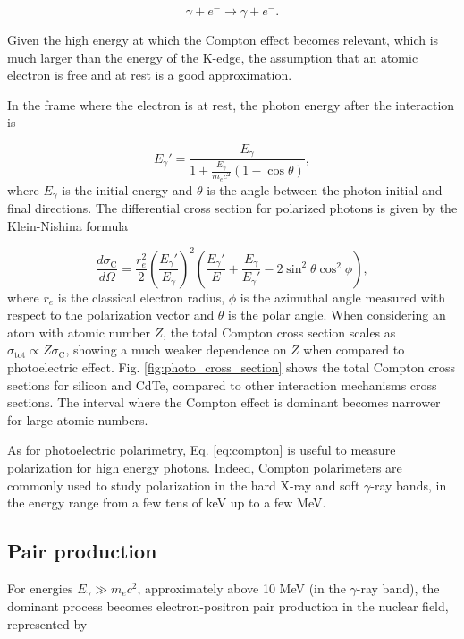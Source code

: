 \begin{equation}
\gamma + e^- \rightarrow \gamma + e^- .
\end{equation}

Given the high energy at which the Compton effect becomes relevant, which is much larger than the energy of the K-edge, the assumption that an atomic electron is free and at rest is a good approximation.

In the frame where the electron is at rest, the photon energy after the interaction is

\begin{equation}
E_{\gamma}' = \frac{E_{\gamma}}{1 + \frac{E_{\gamma}}{m_e c^2}(1 - \cos \theta)},
\end{equation}
where $E_{\gamma}$ is the initial energy and $\theta$ is the angle between the photon initial and final directions. The differential cross section for polarized photons is given by the Klein-Nishina formula

\begin{equation}
\frac{d \sigma_{\textrm{C}}}{d \Omega} = \frac{r_e^2}{2} \left( \frac{E_{\gamma}'}{E_{\gamma}} \right)^2 \left( \frac{E_{\gamma}'}{E} + \frac{E_{\gamma}}{E_{\gamma}'} - 2 \sin^2 \theta \cos^2 \phi \right),
\label{eq:compton}
\end{equation}
where $r_e$ is the classical electron radius, $\phi$ is the azimuthal angle measured with respect to the polarization vector and $\theta$ is the polar angle. When considering an atom with atomic number $Z$, the total Compton cross section scales as $\sigma_{\textrm{tot}} \propto Z \sigma_{\textrm{C}} $, showing a much weaker dependence on $Z$ when compared to photoelectric effect. Fig. \ref{fig:photo_cross_section} shows the total Compton cross sections for silicon and CdTe, compared to other interaction mechanisms cross sections. The interval where the Compton effect is dominant becomes narrower for large atomic numbers. 

As for photoelectric polarimetry, Eq. \ref{eq:compton} is useful to measure polarization for high energy photons. Indeed, Compton polarimeters are commonly used to study polarization in the hard X-ray and soft $\gamma$-ray bands, in the energy range from a few tens of keV up to a few MeV. 

\subsection{Pair production}
For energies $E_{\gamma} \gg m_ec^2$, approximately above 10 MeV (in the $\gamma$-ray band), the dominant process becomes electron-positron pair production in the nuclear field, represented by

